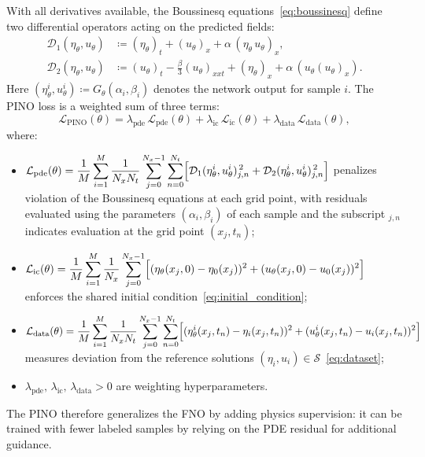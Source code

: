 With all derivatives available, the Boussinesq equations~\eqref{eq:boussinesq} define two differential operators acting on the predicted fields:
\begin{align}
    \mathcal{D}_1(\eta_\theta, u_\theta) &\coloneqq (\eta_\theta)_t + (u_\theta)_x
               + \alpha\,(\eta_\theta\,u_\theta)_x, \label{eq:res1} \\
    \mathcal{D}_2(\eta_\theta, u_\theta) &\coloneqq (u_\theta)_t - \tfrac{\beta}{3}(u_\theta)_{xxt}
               + (\eta_\theta)_x + \alpha\,(u_\theta(u_\theta)_x). \label{eq:res2}
\end{align}
Here $(\eta_\theta^i, u_\theta^i) \coloneqq G_\theta(\alpha_i, \beta_i)$ denotes the network output for sample $i$. The PINO loss is a weighted sum of three terms:
\begin{equation}\label{eq:pino_loss}
    \mathcal{L}_{\text{PINO}}(\theta) = \lambda_{\text{pde}}\,\mathcal{L}_{\text{pde}}(\theta)
    + \lambda_{\text{ic}}\,\mathcal{L}_{\text{ic}}(\theta)
    + \lambda_{\text{data}}\,\mathcal{L}_{\text{data}}(\theta),
\end{equation}
\noindent where:
\begin{itemize}
    \item $\mathcal{L}_{\text{pde}}(\theta) = \dfrac{1}{M}\displaystyle\sum_{i=1}^{M}\dfrac{1}{N_x N_t}\displaystyle\sum_{j=0}^{N_x-1}\sum_{n=0}^{N_t}
          \Bigl[\mathcal{D}_1(\eta_\theta^i, u_\theta^i)_{j,n}^{\,2} + \mathcal{D}_2(\eta_\theta^i, u_\theta^i)_{j,n}^{\,2}\Bigr]$
          penalizes violation of the Boussinesq equations at each grid point, with residuals evaluated using the parameters $(\alpha_i,\beta_i)$ of each sample and the subscript $_{j,n}$ indicates evaluation at the grid point $(x_j, t_n)$;

    \item $\mathcal{L}_{\text{ic}}(\theta) = \dfrac{1}{M}\displaystyle\sum_{i=1}^{M}\dfrac{1}{N_x}\displaystyle\sum_{j=0}^{N_x-1}
          \Bigl[(\eta_\theta(x_j,0) - \eta_0(x_j))^2 +
          (u_\theta(x_j,0) - u_0(x_j))^2\Bigr]$
          enforces the shared initial condition~\eqref{eq:initial_condition};

    \item $\mathcal{L}_{\text{data}}(\theta) = \dfrac{1}{M}\displaystyle\sum_{i=1}^{M}\dfrac{1}{N_x N_t}\displaystyle\sum_{j=0}^{N_x-1}\sum_{n=0}^{N_t}
          \Bigl[(\eta_\theta^i(x_j,t_n) - \eta_i(x_j,t_n))^2 +
          (u_\theta^i(x_j,t_n) - u_i(x_j,t_n))^2\Bigr]$
          measures deviation from the reference solutions $(\eta_i,u_i) \in \mathcal{S}$~\eqref{eq:dataset};

    \item $\lambda_{\text{pde}},\, \lambda_{\text{ic}},\, \lambda_{\text{data}} > 0$
          are weighting hyperparameters.
\end{itemize}
The PINO therefore generalizes the FNO by adding physics supervision: it can be trained with fewer labeled samples by relying on the PDE residual for additional guidance.
